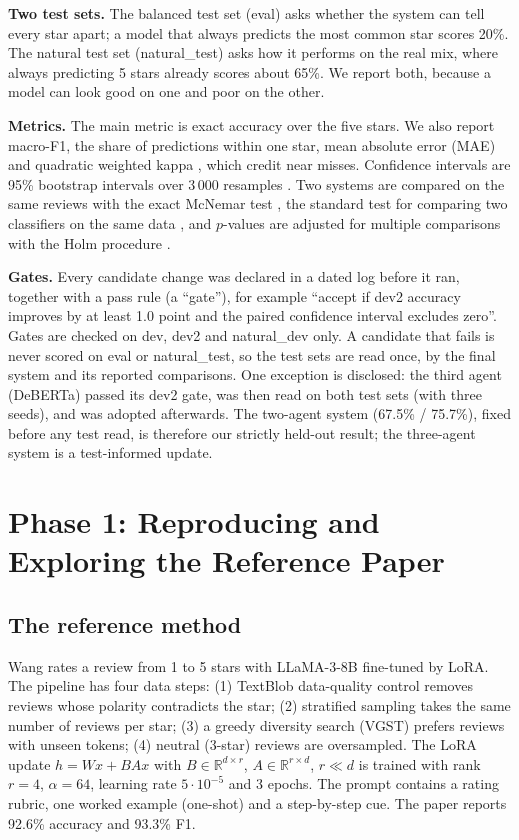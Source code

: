 \documentclass[runningheads]{llncs}
\begin{document}
\textbf{Two test sets.} The balanced test set (eval) asks whether the system can tell every star apart; a model that always predicts the most common star scores 20\%. The natural test set (natural\_test) asks how it performs on the real mix, where always predicting 5 stars already scores about 65\%. We report both, because a model can look good on one and poor on the other.

\textbf{Metrics.} The main metric is exact accuracy over the five stars. We also report macro-F1, the share of predictions within one star, mean absolute error (MAE) and quadratic weighted kappa \cite{cohen1968kappa}, which credit near misses. Confidence intervals are 95\% bootstrap intervals over 3\,000 resamples \cite{efron1979}. Two systems are compared on the same reviews with the exact McNemar test \cite{mcnemar1947}, the standard test for comparing two classifiers on the same data \cite{dietterich1998tests,dror2018hitchhiker}, and $p$-values are adjusted for multiple comparisons with the Holm procedure \cite{holm1979}.

\textbf{Gates.} Every candidate change was declared in a dated log before it ran, together with a pass rule (a ``gate''), for example ``accept if dev2 accuracy improves by at least 1.0 point and the paired confidence interval excludes zero''. Gates are checked on dev, dev2 and natural\_dev only. A candidate that fails is never scored on eval or natural\_test, so the test sets are read once, by the final system and its reported comparisons. One exception is disclosed: the third agent (DeBERTa) passed its dev2 gate, was then read on both test sets (with three seeds), and was adopted afterwards. The two-agent system (67.5\% / 75.7\%), fixed before any test read, is therefore our strictly held-out result; the three-agent system is a test-informed update.

\section{Phase 1: Reproducing and Exploring the Reference Paper}
\label{sec:phase1}

\subsection{The reference method}

Wang \cite{wang2025} rates a review from 1 to 5 stars with LLaMA-3-8B fine-tuned by LoRA. The pipeline has four data steps: (1) TextBlob data-quality control removes reviews whose polarity contradicts the star; (2) stratified sampling takes the same number of reviews per star; (3) a greedy diversity search (VGST) prefers reviews with unseen tokens; (4) neutral (3-star) reviews are oversampled. The LoRA update $h = Wx + BAx$ with $B\in\mathbb{R}^{d\times r}$, $A\in\mathbb{R}^{r\times d}$, $r \ll d$ is trained with rank $r=4$, $\alpha=64$, learning rate $5\cdot10^{-5}$ and 3 epochs. The prompt contains a rating rubric, one worked example (one-shot) and a step-by-step cue. The paper reports 92.6\% accuracy and 93.3\% F1.
\end{document}
